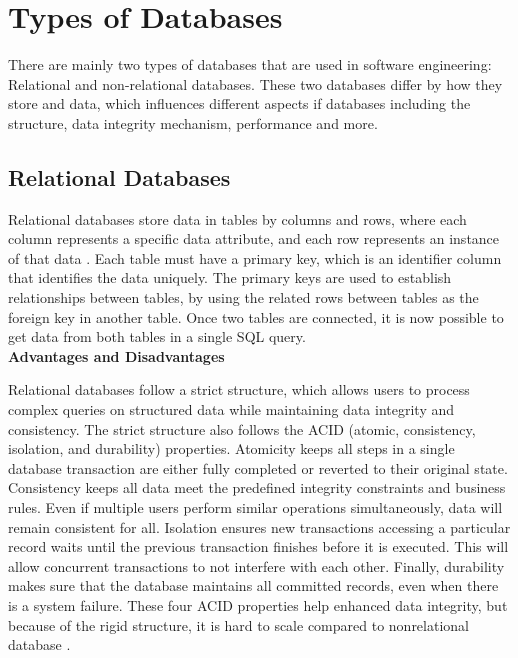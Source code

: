 \section[Types of Databases]{Types of Databases}
There are mainly two types of databases that are used in software engineering: Relational and non-relational databases. 
These two databases differ by how they store and data, which influences different aspects if databases including the structure, data integrity mechanism, performance and more. 

\subsection[Relational Databases]{Relational Databases}
Relational databases store data in tables by columns and rows, where each column represents a specific data attribute, 
and each row represents an instance of that data \cite{Amazon_Web_Services}. Each table must have a primary key, which is an identifier column that identifies the data uniquely.
The primary keys are used to establish relationships between tables, by using the related rows between tables as the foreign key in another table. 
Once two tables are connected, it is now possible to get data from both tables in a single SQL query.\\

\noindent \textbf{Advantages and Disadvantages}

Relational databases follow a strict structure, which allows users to process complex queries on structured data while maintaining data integrity and consistency. 
The strict structure also follows the ACID (atomic, consistency, isolation, and durability) properties.
Atomicity keeps all steps in a single database transaction are either fully completed or reverted to their original state.
Consistency keeps all data meet the predefined integrity constraints and business rules. Even if multiple users perform similar operations simultaneously,
data will remain consistent for all. 
Isolation ensures new transactions accessing a particular record waits until the previous transaction finishes before it is executed. 
This will allow concurrent transactions to not interfere with each other.
Finally, durability makes sure that the database maintains all committed records, even when there is a system failure. 
These four ACID properties help enhanced data integrity, but because of the rigid structure, it is hard to scale compared to nonrelational database \cite{Amazon_Web_Services}.

